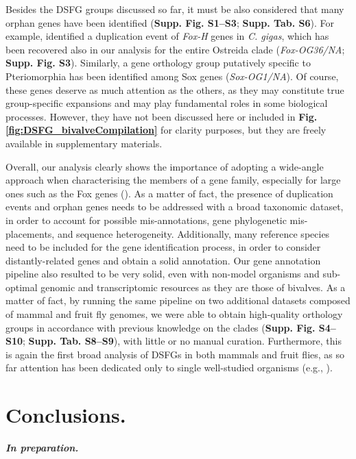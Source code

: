 \documentclass[../main.tex]{subfiles}
\begin{document}
Besides the DSFG groups discussed so far, it must be also considered that many orphan genes have been identified (\textbf{Supp. Fig. S1--S3}; \textbf{Supp. Tab. S6}). For example, \textbf{\cite{wu2020identification}} identified a duplication event of \textit{Fox-H} genes in \textit{C. gigas}, which has been recovered also in our analysis for the entire Ostreida clade (\textit{Fox-OG36/NA}; \textbf{Supp. Fig. S3}). Similarly, a gene orthology group putatively specific to Pteriomorphia has been identified among Sox genes (\textit{Sox-OG1/NA}). Of course, these genes deserve as much attention as the others, as they may constitute true group-specific expansions and may play fundamental roles in some biological processes. However, they have not been discussed here or included in \textbf{Fig. \ref{fig:DSFG_bivalveCompilation}} for clarity purposes, but they are freely available in supplementary materials.

Overall, our analysis clearly shows the importance of adopting a wide-angle approach when characterising the members of a gene family, especially for large ones such as the Fox genes (\textbf{\cite{schomburg2022phylogenetic}}). As a matter of fact, the presence of duplication events and orphan genes needs to be addressed with a broad taxonomic dataset, in order to account for possible mis-annotations, gene phylogenetic mis-placements, and sequence heterogeneity. Additionally, many reference species need to be included for the gene identification process, in order to consider distantly-related genes and obtain a solid annotation. Our gene annotation pipeline also resulted to be very solid, even with non-model organisms and sub-optimal genomic and transcriptomic resources as they are those of bivalves. As a matter of fact, by running the same pipeline on two additional datasets composed of mammal and fruit fly genomes, we were able to obtain high-quality orthology groups in accordance with previous knowledge on the clades (\textbf{Supp. Fig. S4--S10}; \textbf{Supp. Tab. S8--S9}), with little or no manual curation. Furthermore, this is again the first broad analysis of DSFGs in both mammals and fruit flies, as so far attention has been dedicated only to single well-studied organisms (e.g., \textbf{\cite{jackson2010update}}).

\section{Conclusions.} \label{chapter3_conclusions}

\textbf{\textit{In preparation.}}
\end{document}
